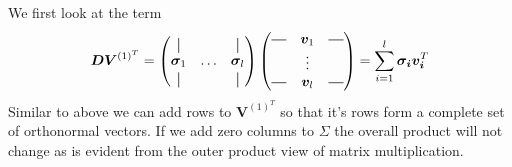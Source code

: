     We first look at the term 
    \begin{align}
        \bm{DV}^{(1)^T} = 
        \begin{pmatrix}
        \vertbar &        & \vertbar \\
        \bm{\sigma}_1 & \hdots & \bm{\sigma}_l \\
        \vertbar &        & \vertbar 
        \end{pmatrix}
        \begin{pmatrix}
            \horzbar & \bm{v}_1 & \horzbar \\
                      & \vdots   &  \\
            \horzbar & \bm{v}_l &  \horzbar \\
        \end{pmatrix}  = \sum_{i=1}^l \bm{\sigma_i} \bm{v_i}^T
    \end{align}
    Similar to above we can add rows to $\bm{V}^{(1)^T}$ so that it's rows form a
    complete set of orthonormal vectors. If we add zero columns to $\Sigma$ the overall product
    will not change as is evident from the outer product view of matrix multiplication.
    
